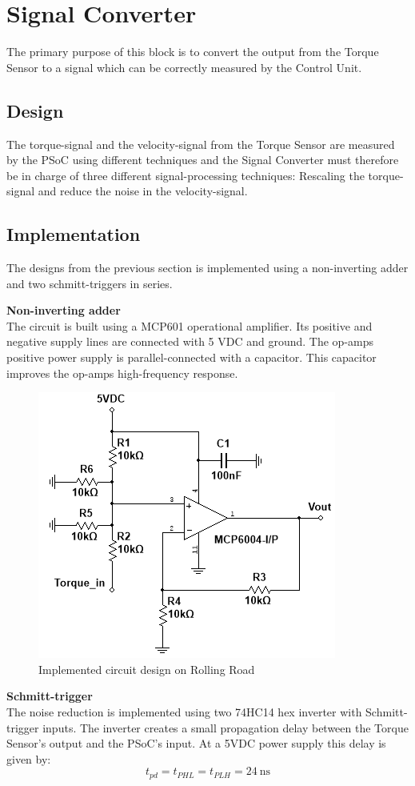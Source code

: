 \newpage
\section{Signal Converter}
The primary purpose of this block is to convert the output from the Torque Sensor to a signal which can be correctly measured by the Control Unit.

\subsection{Design}
The torque-signal and the velocity-signal from the Torque Sensor are measured by the PSoC using different techniques and the Signal Converter must therefore be in charge of three different signal-processing techniques: Rescaling the torque-signal and reduce the noise in the velocity-signal.




\subsection{Implementation}
The designs from the previous section is implemented using a non-inverting adder and two schmitt-triggers in series.

\textbf{Non-inverting adder}\\
The circuit is built using a MCP601 operational amplifier. Its positive and negative supply lines are connected with 5 VDC and ground. The op-amps positive power supply is parallel-connected with a capacitor. This capacitor improves the op-amps high-frequency response.

\begin{figure}[H]
	\centering
	\includegraphics[width=0.4\linewidth]{Hardware/SignalConverter/TorqueDesign3}
	\caption{Implemented circuit design on Rolling Road}
	\label{fig:SignalConverterTorque3}
\end{figure}

\textbf{Schmitt-trigger}\\
The noise reduction is implemented using two 74HC14 hex inverter with Schmitt-trigger inputs. The inverter creates a small propagation delay between the Torque Sensor's output and the PSoC's input. At a 5VDC power supply this delay is given by:
\begin{equation}
	t_{pd} = t_{PHL} = t_{PLH} = \SI{24}{\nano \second}
\end{equation}

